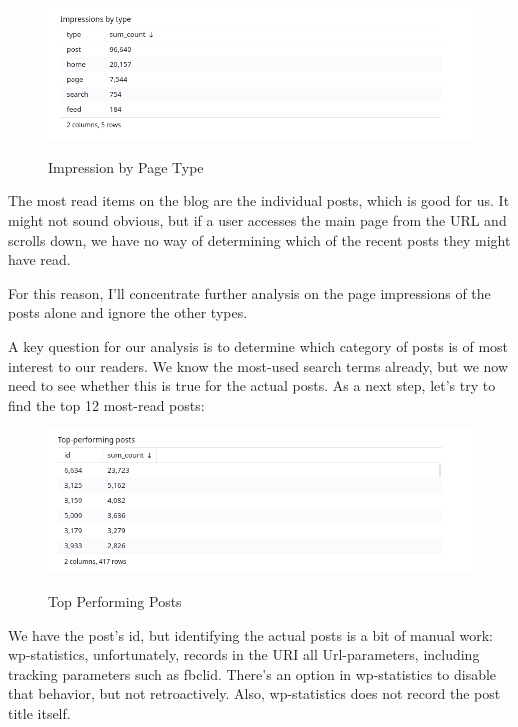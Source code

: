 \begin{figure}[H]
\centering
\caption {Impression by Page Type}
\includegraphics[width=\linewidth]{images/figure11.png}
\label{fig:impressionType}
\end{figure}

The most read items on the blog are the individual posts, which is good for us. It might not sound obvious, but if a user accesses the main page from the URL and scrolls down, we have no way of determining which of the recent posts they might have read.

For this reason, I'll concentrate further analysis on the page impressions of the posts alone and ignore the other types.

A key question for our analysis is to determine which category of posts is of most interest to our readers. We know the most-used search terms already, but we now need to see whether this is true for the actual posts. As a next step, let's try to find the top 12 most-read posts:

\begin{figure}[H]
\centering
\caption {Top Performing Posts}
\includegraphics[width=\linewidth]{images/figure12.png}
\label{fig:topPerforming}
\end{figure}

We have the post's id, but identifying the actual posts is a bit of manual work: wp-statistics, unfortunately, records in the URI all Url-parameters, including tracking parameters such as fbclid. There's an option in wp-statistics to disable that behavior, but not retroactively. Also, wp-statistics does not record the post title itself. 

